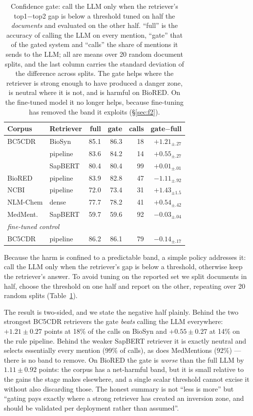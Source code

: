 \documentclass[11pt]{article}
\begin{document}
\begin{table}[t]
\centering\footnotesize
\setlength{\tabcolsep}{2.6pt}
\begin{tabular}{llrrrr}
\toprule
Corpus & Retriever & full & gate & calls & gate$-$full \\
\midrule
BC5CDR & BioSyn & 85.1 & 86.3 & 18 & $+1.21_{\pm.27}$ \\
 & pipeline & 83.6 & 84.2 & 14 & $+0.55_{\pm.27}$ \\
 & SapBERT & 80.4 & 80.4 & 99 & $+0.01_{\pm.01}$ \\
BioRED & pipeline & 83.9 & 82.8 & 47 & $-1.11_{\pm.92}$ \\
NCBI & pipeline & 72.0 & 73.4 & 31 & $+1.43_{\pm1.5}$ \\
NLM-Chem & dense & 77.7 & 78.2 & 41 & $+0.54_{\pm.42}$ \\
MedMent. & SapBERT & 59.7 & 59.6 & 92 & $-0.03_{\pm.04}$ \\
\midrule
\multicolumn{6}{l}{\emph{fine-tuned control}} \\
BC5CDR & pipeline & 86.2 & 86.1 & 79 & $-0.14_{\pm.17}$ \\
\bottomrule
\end{tabular}
\caption{Confidence gate: call the LLM only when the retriever's top1$-$top2 gap is
below a threshold tuned on half the \emph{documents} and evaluated on the other half.
``full'' is the accuracy of calling the LLM on every mention, ``gate'' that of the
gated system and ``calls'' the share of mentions it sends to the LLM; all are means
over 20 random document splits, and the last column carries the standard deviation of
the difference across splits. The gate helps where the
retriever is strong enough to have produced a danger zone, is neutral where it is not,
and is harmful on BioRED. On the fine-tuned model it no longer helps, because
fine-tuning has removed the band it exploits (\S\ref{sec:f2}).}
\label{tab:gate}
\end{table}

Because the harm is confined to a predictable band, a simple policy addresses it: call
the LLM only when the retriever's gap is below a threshold, otherwise keep the
retriever's answer. To avoid tuning on the reported set we split documents in half,
choose the threshold on one half and report on the other, repeating over 20 random
splits (Table~\ref{tab:gate}).

The result is two-sided, and we state the negative half plainly. Behind the two
strongest BC5CDR retrievers the gate \emph{beats} calling the LLM everywhere:
$+1.21\pm0.27$ points at 18\% of the calls on BioSyn and $+0.55\pm0.27$ at 14\% on the
rule pipeline. Behind the weaker SapBERT retriever it is exactly neutral and selects
essentially every mention (99\% of calls), as does MedMentions (92\%) --- there is no
band to remove. On BioRED the gate is \emph{worse} than the full LLM by
$1.11\pm0.92$ points: the corpus has a net-harmful band, but it is small relative to
the gains the stage makes elsewhere, and a single scalar threshold cannot excise it
without also discarding those. The honest summary is not ``less is more'' but
``gating pays exactly where a strong retriever has created an inversion zone, and
should be validated per deployment rather than assumed''.
\end{document}
